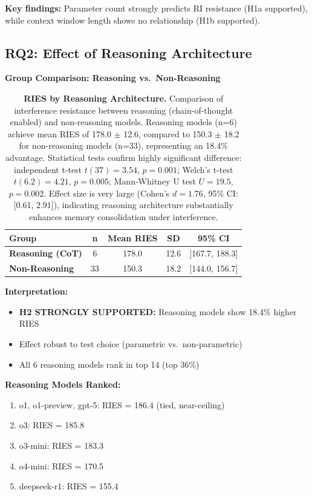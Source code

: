 \documentclass{article}
\begin{document}
\textbf{Key findings:} Parameter count strongly predicts RI resistance (H1a supported), while context window length shows no relationship (H1b supported).

\subsection{RQ2: Effect of Reasoning Architecture}

\textbf{Group Comparison: Reasoning vs.\ Non-Reasoning}

\begin{table}[t]
\centering
\caption{\textbf{RIES by Reasoning Architecture.}
Comparison of interference resistance between reasoning (chain-of-thought enabled) and non-reasoning models.
Reasoning models (n=6) achieve mean RIES of 178.0 $\pm$ 12.6, compared to 150.3 $\pm$ 18.2 for non-reasoning models (n=33), representing an 18.4\% advantage.
Statistical tests confirm highly significant difference: independent t-test $t(37) = 3.54$, $p = 0.001$; Welch's t-test $t(6.2) = 4.21$, $p = 0.005$; Mann-Whitney U test $U = 19.5$, $p = 0.002$.
Effect size is very large (Cohen's $d = 1.76$, 95\% CI: [0.61, 2.91]), indicating reasoning architecture substantially enhances memory consolidation under interference.}
\begin{tabular}{lcccc}
\toprule
Group & n & Mean RIES & SD & 95\% CI \\
\midrule
\textbf{Reasoning (CoT)} & 6 & 178.0 & 12.6 & [167.7, 188.3] \\
\textbf{Non-Reasoning} & 33 & 150.3 & 18.2 & [144.0, 156.7] \\
\bottomrule
\end{tabular}
\end{table}

\textbf{Interpretation:}
\begin{itemize}[itemsep=2pt,topsep=3pt,parsep=0pt]
    \item \textbf{H2 STRONGLY SUPPORTED:} Reasoning models show 18.4\% higher RIES
    \item Effect robust to test choice (parametric vs.\ non-parametric)
    \item All 6 reasoning models rank in top 14 (top 36\%)
\end{itemize}

\textbf{Reasoning Models Ranked:}
\begin{enumerate}
    \item o1, o1-preview, gpt-5: RIES = 186.4 (tied, near-ceiling)
    \item o3: RIES = 185.8
    \item o3-mini: RIES = 183.3
    \item o4-mini: RIES = 170.5
    \item deepseek-r1: RIES = 155.4
\end{enumerate}
\end{document}
